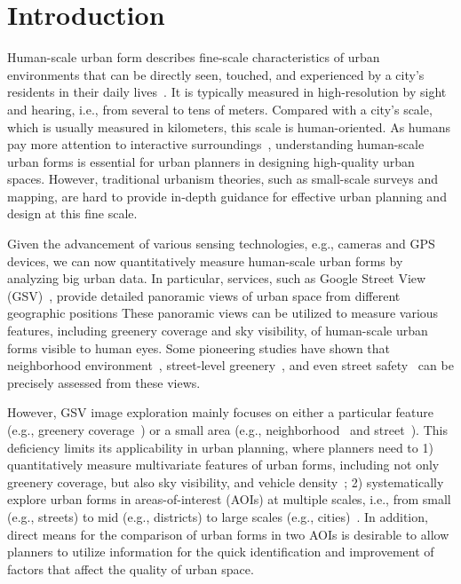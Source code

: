\section{Introduction}
Human-scale urban form describes fine-scale characteristics of urban environments that can be directly seen, touched, and experienced by a city's residents in their daily lives~\cite{long_2016_human-scale}.
It is typically measured in high-resolution by sight and hearing, i.e., from several to tens of meters.
Compared with a city's scale, which is usually measured in kilometers, this scale is human-oriented.
As humans pay more attention to interactive surroundings~\cite{gehl_1971_life}, understanding human-scale urban forms is essential for urban planners in designing high-quality urban spaces. 
However, traditional urbanism theories, such as small-scale surveys and mapping, are hard to provide in-depth guidance for effective urban planning and design at this fine scale.

Given the advancement of various sensing technologies, e.g., cameras and GPS devices, we can now quantitatively measure human-scale urban forms by analyzing big urban data.
In particular, services, such as Google Street View (GSV)~\cite{anguelov2010google}, provide detailed panoramic views of urban space from different geographic positions
These panoramic views can be utilized to measure various features, including greenery coverage and sky visibility, of human-scale urban forms visible to human eyes.
Some pioneering studies have shown that neighborhood environment~\cite{rundle_2011_using}, street-level greenery~\cite{li_2015_accessing}, and even street safety~\cite{Naik_2014_streetscore} can be precisely assessed from these views.

However, GSV image exploration mainly focuses on either a particular feature (e.g., greenery coverage~\cite{li_2015_accessing}) or a small area (e.g., neighborhood~\cite{rundle_2011_using} and street~\cite{Naik_2014_streetscore, li_2015_accessing}).
This deficiency limits its applicability in urban planning, where planners need to 
1) quantitatively measure multivariate features of urban forms, including not only greenery coverage, but also sky visibility, and vehicle density~\cite{long_2017_how}; 
2) systematically explore urban forms in areas-of-interest (AOIs) at multiple scales, i.e., from small (e.g., streets) to mid (e.g., districts) to large scales (e.g., cities)~\cite{liu_2015_understanding}.
In addition, direct means for the comparison of urban forms in two AOIs is desirable to allow planners to utilize information for the quick identification and improvement of factors that affect the quality of urban space.


